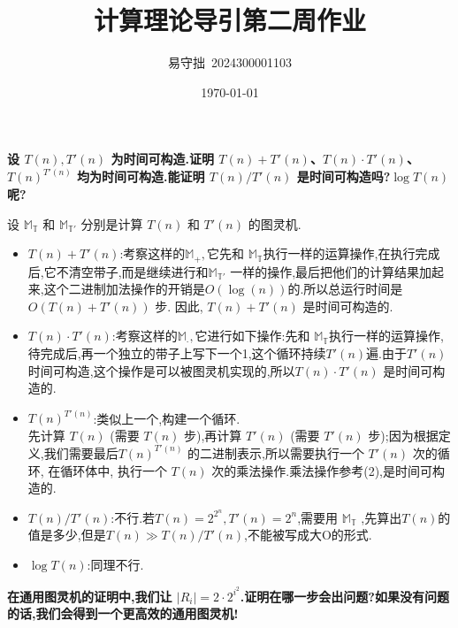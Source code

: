\documentclass{homework}
\author{易守拙\ 2024300001103}
\date{\today}
\title{计算理论导引第二周作业}
\begin{document}
 \maketitle

\question \textbf{设 $T(n), T'(n)$ 为时间可构造.证明 $T(n) + T'(n)$、$T(n) \cdot T'(n)$、$T(n)^{T'(n)}$ 均为时间可构造.能证明 $T(n)/T'(n)$ 是时间可构造吗?$\log T(n)$ 呢?}

\begin{sol}
	设 $\mathbb{M_T}$ 和 $\mathbb{M_{T'}}$ 分别是计算 $T(n)$ 和 $T'(n)$ 的图灵机.
\begin{itemize}
	\item $T(n) + T'(n)$:考察这样的$\mathbb{M_+},$它先和 $\mathbb{M_T}$执行一样的运算操作,在执行完成后,它不清空带子,而是继续进行和$\mathbb{M_{T'}}$ 一样的操作,最后把他们的计算结果加起来,这个二进制加法操作的开销是$O(\log(n))$的.所以总运行时间是 $O(T(n) + T'(n))$ 步. 因此, $T(n) + T'(n)$ 是时间可构造的.
	\item $T(n) \cdot T'(n)$:考察这样的$\mathbb{M_\cdot},$它进行如下操作:先和 $\mathbb{M_T}$执行一样的运算操作,待完成后,再一个独立的带子上写下一个1,这个循环持续$T'(n)$遍.由于$T'(n)$时间可构造,这个操作是可以被图灵机实现的,所以$T(n) \cdot T'(n)$ 是时间可构造的.
	\item $T(n)^{T'(n)}$:类似上一个,构建一个循环.\\
	 先计算 $T(n)$ (需要 $T(n)$ 步),再计算 $T'(n)$ (需要 $T'(n)$ 步);因为根据定义,我们需要最后$T(n)^{T'(n)}$ 的二进制表示,所以需要执行一个 $T'(n)$ 次的循环, 在循环体中, 执行一个 $T(n)$ 次的乘法操作.乘法操作参考(2),是时间可构造的.
	 \item $T(n)/T'(n)$:不行.若$T(n) =2^{2^n},T'(n) = 2^{n}$,需要用 $\mathbb{M_T}$ ,先算出$T(n)$的值是多少,但是$T(n) \gg T(n)/T'(n)$,不能被写成大O的形式.
	 \item $\log T(n)$:同理不行.
\end{itemize}
  
\end{sol}
\question \textbf{在通用图灵机的证明中,我们让 $|R_i| = 2 \cdot 2^{i^2}$.证明在哪一步会出问题?如果没有问题的话,我们会得到一个更高效的通用图灵机!}
\end{document}
